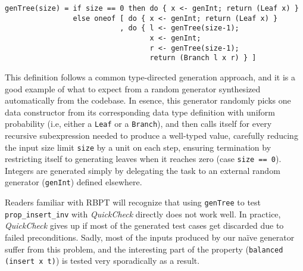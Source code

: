 \documentclass[sigconf,review,anonymous]{acmart}
\newcommand{\quickcheck}{\textit{QuickCheck}\xspace}
\begin{document}



\begin{verbatim}
genTree(size) = if size == 0 then do { x <- genInt; return (Leaf x) }
                else oneof [ do { x <- genInt; return (Leaf x) }
                           , do { l <- genTree(size-1);
                                  x <- genInt;
                                  r <- genTree(size-1);
                                  return (Branch l x r) } ]
\end{verbatim}

\noindent This definition follows a common type-directed generation approach,
and it is a good example of what to expect from a random generator synthesized
automatically from the codebase.
%
In esence, this generator randomly picks one data constructor from its
corresponding data type definition with uniform probability (i.e, either a
\texttt{Leaf} or a \texttt{Branch}), and then calls itself for every recursive
subexpression needed to produce a well-typed value, carefully reducing the input
size limit \texttt{size} by a unit on each step, ensuring termination by
restricting itself to generating leaves when it reaches zero (case \texttt{size
  == 0}).
%
Integers are generated simply by delegating the task to an external random
generator (\texttt{genInt}) defined elsewhere.
%


Readers familiar with RBPT will recognize that using \texttt{genTree} to test
\texttt{prop\_insert\_inv} with \quickcheck directly does not work well.
%
In practice, \quickcheck gives up if most of the generated test cases get
discarded due to failed preconditions.
%
%
Sadly, most of the inputs produced by our na\"ive generator suffer from this
problem, and the interesting part of the property (\texttt{balanced (insert x
  t)}) is tested very sporadically as a result.
\end{document}
